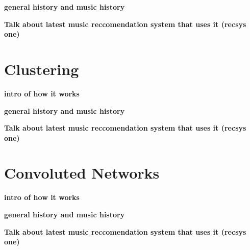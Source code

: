 \textbf{general history and music history}

\textbf{Talk about latest music reccomendation system that uses it (recsys one)}
\section{Clustering}
\textbf{intro of how it works}

\textbf{general history and music history}

\textbf{Talk about latest music reccomendation system that uses it (recsys one)}

\section{Convoluted Networks}
\textbf{intro of how it works}

\textbf{general history and music history}

\textbf{Talk about latest music reccomendation system that uses it (recsys one)}

